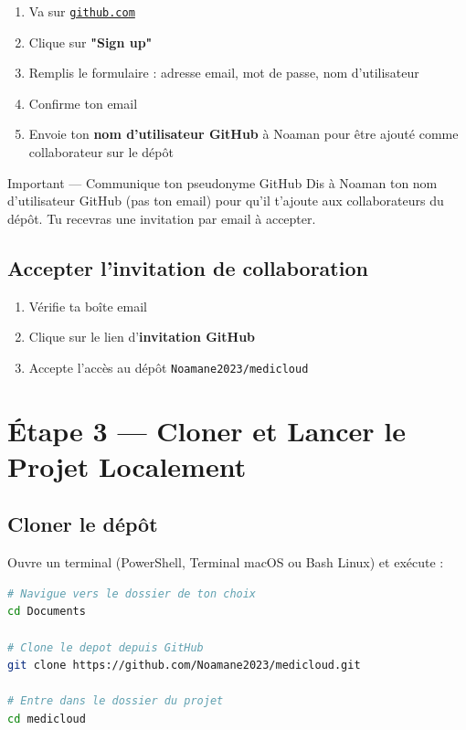 \documentclass[12pt, a4paper]{article}
\begin{document}
\begin{enumerate}[label=\arabic*.]
  \item Va sur \href{https://github.com}{\texttt{github.com}}
  \item Clique sur \textbf{"Sign up"}
  \item Remplis le formulaire : adresse email, mot de passe, nom d'utilisateur
  \item Confirme ton email
  \item Envoie ton \textbf{nom d'utilisateur GitHub} à Noaman pour être ajouté
        comme collaborateur sur le dépôt
\end{enumerate}

\begin{warnbox}{Important — Communique ton pseudonyme GitHub}
  Dis à Noaman ton nom d'utilisateur GitHub (pas ton email) pour qu'il
  t'ajoute aux collaborateurs du dépôt. Tu recevras une invitation par email
  à accepter.
\end{warnbox}

\subsection{Accepter l'invitation de collaboration}

\begin{enumerate}[label=\arabic*.]
  \item Vérifie ta boîte email
  \item Clique sur le lien d'\textbf{invitation GitHub}
  \item Accepte l'accès au dépôt \texttt{Noamane2023/medicloud}
\end{enumerate}

\section{Étape 3 — Cloner et Lancer le Projet Localement}

\subsection{Cloner le dépôt}

Ouvre un terminal (PowerShell, Terminal macOS ou Bash Linux) et exécute :

\begin{lstlisting}[language=bash]
# Navigue vers le dossier de ton choix
cd Documents

# Clone le depot depuis GitHub
git clone https://github.com/Noamane2023/medicloud.git

# Entre dans le dossier du projet
cd medicloud
\end{lstlisting}
\end{document}
